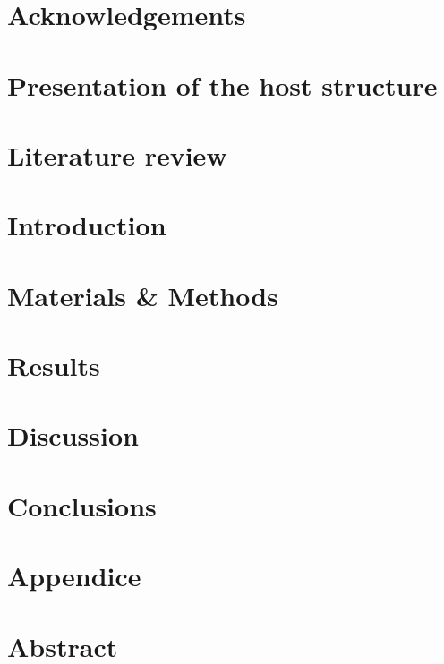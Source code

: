 \documentclass[a4paper, 12pt, hidelinks]{article}
\begin{document}


\newpage

\section{Acknowledgements}


\newpage
\tableofcontents
\listoffigures
\listoftables

\clearpage
\section{Presentation of the host structure}


\newpage


\section{Literature review}



\section{Introduction}


\section{Materials \& Methods}


\section{Results}


\section{Discussion}


\section{Conclusions}





\begin{multicols}{2}

\end{multicols}

\restoregeometry

\appendix
\section{Appendice}


\clearpage
\singlespace
\section{Abstract}

\end{document}
